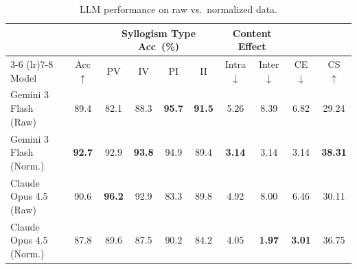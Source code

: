 \begin{table}[t]
  \centering
  \caption{LLM performance on raw vs.\ normalized data.}
  \label{tab:llm_raw_vs_normalized}
  \begin{tabular}{l ccccc cc cc}
    \toprule
    & & \multicolumn{4}{c}{Syllogism Type Acc~(\%)} & \multicolumn{2}{c}{Content Effect} & & \\
    \cmidrule(lr){3-6} \cmidrule(lr){7-8}
    Model & Acc $\uparrow$ & PV & IV & PI & II & Intra $\downarrow$ & Inter $\downarrow$ & CE $\downarrow$ & CS $\uparrow$ \\
    \midrule
    Gemini 3 Flash (Raw) & 89.4 & 82.1 & 88.3 & \textbf{95.7} & \textbf{91.5} & 5.26 & 8.39 & 6.82 & 29.24 \\
    Gemini 3 Flash (Norm.) & \textbf{92.7} & 92.9 & \textbf{93.8} & 94.9 & 89.4 & \textbf{3.14} & 3.14 & 3.14 & \textbf{38.31} \\
    \midrule
    Claude Opus 4.5 (Raw) & 90.6 & \textbf{96.2} & 92.9 & 83.3 & 89.8 & 4.92 & 8.00 & 6.46 & 30.11 \\
    Claude Opus 4.5 (Norm.) & 87.8 & 89.6 & 87.5 & 90.2 & 84.2 & 4.05 & \textbf{1.97} & \textbf{3.01} & 36.75 \\
    \bottomrule
  \end{tabular}
\end{table}
